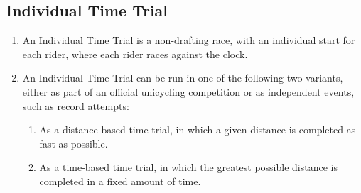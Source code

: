 \subsection{Individual Time Trial}
	\begin{enumerate}[leftmargin=1.5em,labelsep=*]
		\item An Individual Time Trial is a non-drafting race, with an individual start for each rider, where each rider races against the clock.
		\item An Individual Time Trial can be run in one of the following two variants, either as part of an 
        official unicycling competition or as independent events, such as record attempts:
		\begin{enumerate}[label*=\arabic*,leftmargin=1.5em,labelsep=*]
			\item As a distance-based time trial, in which a given distance is completed as fast as possible.
			\item As a time-based time trial, in which the greatest possible distance is completed in a fixed amount of time.
		\end{enumerate}
	\end{enumerate}


